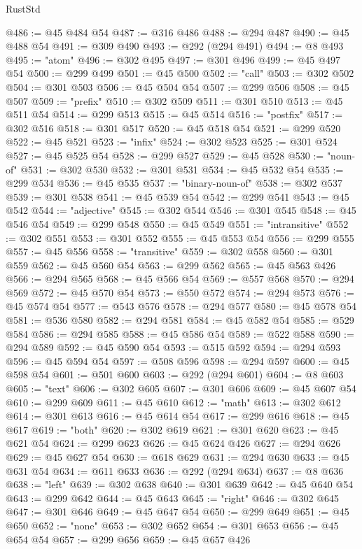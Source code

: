 \begin{lexlean}{RustStd}
\begin{coremodule}
@486 := @45 @484 @54
@487 := @316 @486
@488 := @294 @487
@490 := @45 @488 @54
@491 := @309 @490
@493 := @292 (@294 @491)
@494 := @8 @493
@495 := "atom"
@496 := @302 @495
@497 := @301 @496
@499 := @45 @497 @54
@500 := @299 @499
@501 := @45 @500
@502 := "call"
@503 := @302 @502
@504 := @301 @503
@506 := @45 @504 @54
@507 := @299 @506
@508 := @45 @507
@509 := "prefix"
@510 := @302 @509
@511 := @301 @510
@513 := @45 @511 @54
@514 := @299 @513
@515 := @45 @514
@516 := "postfix"
@517 := @302 @516
@518 := @301 @517
@520 := @45 @518 @54
@521 := @299 @520
@522 := @45 @521
@523 := "infix"
@524 := @302 @523
@525 := @301 @524
@527 := @45 @525 @54
@528 := @299 @527
@529 := @45 @528
@530 := "noun-of"
@531 := @302 @530
@532 := @301 @531
@534 := @45 @532 @54
@535 := @299 @534
@536 := @45 @535
@537 := "binary-noun-of"
@538 := @302 @537
@539 := @301 @538
@541 := @45 @539 @54
@542 := @299 @541
@543 := @45 @542
@544 := "adjective"
@545 := @302 @544
@546 := @301 @545
@548 := @45 @546 @54
@549 := @299 @548
@550 := @45 @549
@551 := "intransitive"
@552 := @302 @551
@553 := @301 @552
@555 := @45 @553 @54
@556 := @299 @555
@557 := @45 @556
@558 := "transitive"
@559 := @302 @558
@560 := @301 @559
@562 := @45 @560 @54
@563 := @299 @562
@565 := @45 @563 @426
@566 := @294 @565
@568 := @45 @566 @54
@569 := @557 @568
@570 := @294 @569
@572 := @45 @570 @54
@573 := @550 @572
@574 := @294 @573
@576 := @45 @574 @54
@577 := @543 @576
@578 := @294 @577
@580 := @45 @578 @54
@581 := @536 @580
@582 := @294 @581
@584 := @45 @582 @54
@585 := @529 @584
@586 := @294 @585
@588 := @45 @586 @54
@589 := @522 @588
@590 := @294 @589
@592 := @45 @590 @54
@593 := @515 @592
@594 := @294 @593
@596 := @45 @594 @54
@597 := @508 @596
@598 := @294 @597
@600 := @45 @598 @54
@601 := @501 @600
@603 := @292 (@294 @601)
@604 := @8 @603
@605 := "text"
@606 := @302 @605
@607 := @301 @606
@609 := @45 @607 @54
@610 := @299 @609
@611 := @45 @610
@612 := "math"
@613 := @302 @612
@614 := @301 @613
@616 := @45 @614 @54
@617 := @299 @616
@618 := @45 @617
@619 := "both"
@620 := @302 @619
@621 := @301 @620
@623 := @45 @621 @54
@624 := @299 @623
@626 := @45 @624 @426
@627 := @294 @626
@629 := @45 @627 @54
@630 := @618 @629
@631 := @294 @630
@633 := @45 @631 @54
@634 := @611 @633
@636 := @292 (@294 @634)
@637 := @8 @636
@638 := "left"
@639 := @302 @638
@640 := @301 @639
@642 := @45 @640 @54
@643 := @299 @642
@644 := @45 @643
@645 := "right"
@646 := @302 @645
@647 := @301 @646
@649 := @45 @647 @54
@650 := @299 @649
@651 := @45 @650
@652 := "none"
@653 := @302 @652
@654 := @301 @653
@656 := @45 @654 @54
@657 := @299 @656
@659 := @45 @657 @426

\end{coremodule}
\end{lexlean}
